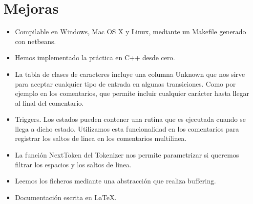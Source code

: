 
\chapter{Mejoras}

\begin{itemize}

    \item Compilable en Windows, Mac OS X y Linux, mediante un Makefile generado con netbeans.

    \item Hemos implementado la práctica en C++ desde cero.
    
    \item La tabla de clases de caracteres incluye una columna Unknown que nos sirve para aceptar cualquier tipo de entrada en algunas transiciones. Como por ejemplo en los comentarios, que permite incluir cualquier carácter hasta llegar al final del comentario.
    
    \item Triggers. Los estados pueden contener una rutina que es ejecutada cuando se llega a dicho estado. Utilizamos esta funcionalidad en los comentarios para registrar los saltos de linea en los comentarios multilinea.
    
    \item La función NextToken del Tokenizer nos permite parametrizar si queremos filtrar los espacios y los saltos de linea.
    
    \item Leemos los ficheros mediante una abstracción que realiza buffering.
    
    \item Documentación escrita en \LaTeX.
    
\end{itemize}
